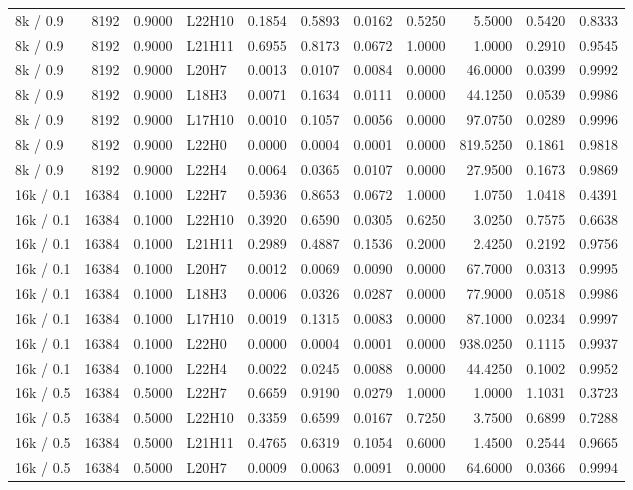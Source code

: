 \begin{tabular}{lrrlrrrrrrr}
8k / 0.9 & 8192 & 0.9000 & L22H10 & 0.1854 & 0.5893 & 0.0162 & 0.5250 & 5.5000 & 0.5420 & 0.8333 \\
8k / 0.9 & 8192 & 0.9000 & L21H11 & 0.6955 & 0.8173 & 0.0672 & 1.0000 & 1.0000 & 0.2910 & 0.9545 \\
8k / 0.9 & 8192 & 0.9000 & L20H7 & 0.0013 & 0.0107 & 0.0084 & 0.0000 & 46.0000 & 0.0399 & 0.9992 \\
8k / 0.9 & 8192 & 0.9000 & L18H3 & 0.0071 & 0.1634 & 0.0111 & 0.0000 & 44.1250 & 0.0539 & 0.9986 \\
8k / 0.9 & 8192 & 0.9000 & L17H10 & 0.0010 & 0.1057 & 0.0056 & 0.0000 & 97.0750 & 0.0289 & 0.9996 \\
8k / 0.9 & 8192 & 0.9000 & L22H0 & 0.0000 & 0.0004 & 0.0001 & 0.0000 & 819.5250 & 0.1861 & 0.9818 \\
8k / 0.9 & 8192 & 0.9000 & L22H4 & 0.0064 & 0.0365 & 0.0107 & 0.0000 & 27.9500 & 0.1673 & 0.9869 \\
16k / 0.1 & 16384 & 0.1000 & L22H7 & 0.5936 & 0.8653 & 0.0672 & 1.0000 & 1.0750 & 1.0418 & 0.4391 \\
16k / 0.1 & 16384 & 0.1000 & L22H10 & 0.3920 & 0.6590 & 0.0305 & 0.6250 & 3.0250 & 0.7575 & 0.6638 \\
16k / 0.1 & 16384 & 0.1000 & L21H11 & 0.2989 & 0.4887 & 0.1536 & 0.2000 & 2.4250 & 0.2192 & 0.9756 \\
16k / 0.1 & 16384 & 0.1000 & L20H7 & 0.0012 & 0.0069 & 0.0090 & 0.0000 & 67.7000 & 0.0313 & 0.9995 \\
16k / 0.1 & 16384 & 0.1000 & L18H3 & 0.0006 & 0.0326 & 0.0287 & 0.0000 & 77.9000 & 0.0518 & 0.9986 \\
16k / 0.1 & 16384 & 0.1000 & L17H10 & 0.0019 & 0.1315 & 0.0083 & 0.0000 & 87.1000 & 0.0234 & 0.9997 \\
16k / 0.1 & 16384 & 0.1000 & L22H0 & 0.0000 & 0.0004 & 0.0001 & 0.0000 & 938.0250 & 0.1115 & 0.9937 \\
16k / 0.1 & 16384 & 0.1000 & L22H4 & 0.0022 & 0.0245 & 0.0088 & 0.0000 & 44.4250 & 0.1002 & 0.9952 \\
16k / 0.5 & 16384 & 0.5000 & L22H7 & 0.6659 & 0.9190 & 0.0279 & 1.0000 & 1.0000 & 1.1031 & 0.3723 \\
16k / 0.5 & 16384 & 0.5000 & L22H10 & 0.3359 & 0.6599 & 0.0167 & 0.7250 & 3.7500 & 0.6899 & 0.7288 \\
16k / 0.5 & 16384 & 0.5000 & L21H11 & 0.4765 & 0.6319 & 0.1054 & 0.6000 & 1.4500 & 0.2544 & 0.9665 \\
16k / 0.5 & 16384 & 0.5000 & L20H7 & 0.0009 & 0.0063 & 0.0091 & 0.0000 & 64.6000 & 0.0366 & 0.9994 \\

\end{tabular}
